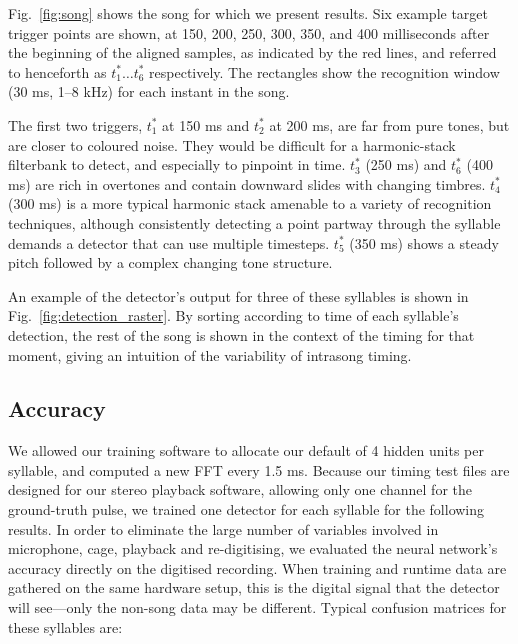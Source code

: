 \documentclass[10pt,letterpaper]{article}
\newcommand\fig[1]{Fig.~\ref{#1}}
\let\oldmarginpar\marginpar
\renewcommand{\marginpar}[1]{\oldmarginpar{\linespread{1}\scriptsize{#1}}}
\begin{document}
\fig{fig:song} shows the song for which we present results.  Six example target trigger points are shown, at 150, 200, 250, 300, 350, and 400 milliseconds after the beginning of the aligned samples, as indicated by the red lines, and referred to henceforth as $t^*_1\ldots t^*_6$ respectively.  The rectangles show the recognition window (30 ms, 1--8 kHz) for each instant in the song.

The first two triggers, $t^*_1$ at 150 ms and $t^*_2$ at 200 ms, are far from pure tones, but are closer to coloured noise.  They would be difficult for a harmonic-stack filterbank to detect, and especially to pinpoint in time.  $t^*_3$ (250 ms) and $t^*_6$ (400 ms) are rich in overtones and contain downward slides with changing timbres.  $t^*_4$ (300 ms) is a more typical harmonic stack amenable to a variety of recognition techniques, although consistently detecting a point partway through the syllable demands a detector that can use multiple timesteps.  $t^*_5$ (350 ms) shows a steady pitch followed by a complex changing tone structure.

An example of the detector's output for three of these syllables is shown in \fig{fig:detection_raster}.   By sorting according to time of each syllable's detection, the rest of the song is shown in the context of the timing for that moment, giving an intuition of the variability of intrasong timing.

\subsection{Accuracy}

We allowed our training software to allocate our default of 4 hidden units per syllable, and computed a new FFT every 1.5 ms.  Because our timing test files are designed for our stereo playback software, allowing only one channel for the ground-truth pulse, we trained one detector for each syllable for the following results.  In order to eliminate the large number of variables involved in microphone, cage, playback and re-digitising, we evaluated the neural network's accuracy directly on the digitised recording.  When training and runtime data are gathered on the same hardware setup, this is the digital signal that the detector will see---only the non-song data may be different.
Typical confusion matrices for these syllables are:
\end{document}
